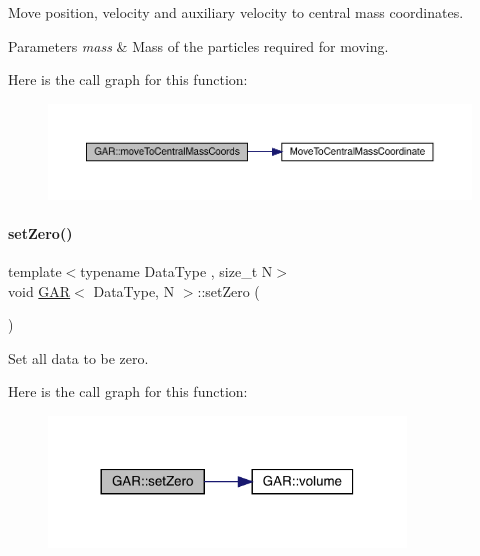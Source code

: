 Move position, velocity and auxiliary velocity to central mass coordinates. 
\begin{DoxyParams}{Parameters}
{\em mass} & Mass of the particles required for moving. \\
\hline
\end{DoxyParams}
Here is the call graph for this function\+:\nopagebreak
\begin{figure}[H]
\begin{center}
\leavevmode
\includegraphics[width=350pt]{class_g_a_r_a373d938047a04b051683ee93198b1832_cgraph}
\end{center}
\end{figure}
\mbox{\label{class_g_a_r_a3c59ee9bf8aae928644fa2beabbffa7c}} 
\paragraph{\texorpdfstring{set\+Zero()}{setZero()}}
{\footnotesize\ttfamily template$<$typename Data\+Type , size\+\_\+t N$>$ \\
void \mbox{\hyperlink{class_g_a_r}{G\+AR}}$<$ Data\+Type, N $>$\+::set\+Zero (\begin{DoxyParamCaption}{ }\end{DoxyParamCaption})\hspace{0.3cm}{\ttfamily [inline]}}



Set all data to be zero. 

Here is the call graph for this function\+:\nopagebreak
\begin{figure}[H]
\begin{center}
\leavevmode
\includegraphics[width=269pt]{class_g_a_r_a3c59ee9bf8aae928644fa2beabbffa7c_cgraph}
\end{center}
\end{figure}
\mbox{\label{class_g_a_r_a850c24cdfd1656389e3e42f575035edb}} 
